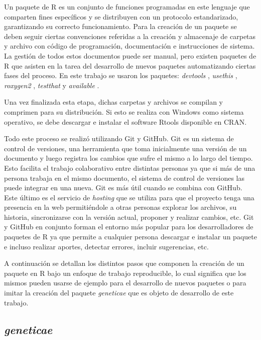 Un paquete de R es un conjunto de funciones programadas en este lenguaje que comparten fines específicos y se distribuyen con un protocolo estandarizado, garantizando su correcto funcionamiento. Para la creación de un paquete se deben seguir ciertas convenciones referidas a la creación y almacenaje de carpetas y archivo con código de programación, documentación e instrucciones de sistema. La gestión de todos estos documentos puede ser manual, pero existen paquetes de R que asisten en la tarea del desarrollo de nuevos paquetes automatizando ciertas fases del proceso. En este trabajo se usaron los paquetes: \emph{devtools} \citep{Wickhametal2021}, \emph{usethis} \citep{WickhamBryan2021}, \emph{roxygen2} \citep{Wickhametal2020}, \emph{testthat} \citep{Wickham2011} y \emph{available} \citep{Ganzetal2019}. 

Una vez finalizada esta etapa, dichas carpetas y archivos se compilan y comprimen para su distribución. Si esto se realiza con Windows como sistema operativo, se debe descargar e instalar el software Rtools disponible en CRAN. 

Todo este proceso se realizó utilizando Git y GitHub. Git es un sistema de control de versiones, una herramienta que toma inicialmente una versión de un documento y luego registra los cambios que sufre el mismo a lo largo del tiempo. Esto facilita el trabajo colaborativo entre distintas personas ya que si más de una persona trabaja en el mismo documento, el sistema de control de versiones las puede integrar en una nueva. Git es más útil cuando se combina con GitHub. Este último es el servicio de \emph{hosting} que se utiliza para que el proyecto tenga una presencia en la web permitiéndole a otras personas explorar los archivos, su historia, sincronizarse con la versión actual, proponer y realizar cambios, etc. Git y GitHub en conjunto forman el entorno más popular para los desarrolladores de paquetes de R ya que permite a cualquier persona descargar e instalar un paquete e incluso realizar aportes, detectar errores, incluir sugerencias, etc.


A continuación se detallan los distintos pasos que componen la creación de un paquete en R bajo un enfoque de trabajo reproducible, lo cual significa que los mismos pueden usarse de ejemplo para el desarrollo de nuevos paquetes o para imitar la creación del paquete \emph{geneticae} que es objeto de desarrollo de este trabajo. 

\subsection{\emph{geneticae}}

